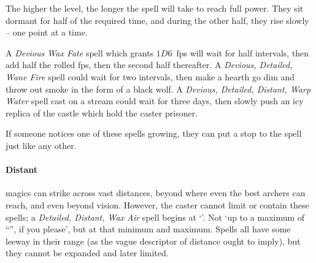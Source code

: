 \begin{multicols}{2}
The higher the level, the longer the spell will take to reach full power.
They sit dormant for half of the required time, and during the other half, they rise slowly -- one point at a time.

A \textit{Devious Wax Fate} spell which grants $1D6$~\glspl{fp} will wait for half \glspl{interval}, then add half the rolled \glspl{fp}, then the second half thereafter.
A \textit{Devious, Detailed, Wane Fire} spell could wait for two \glspl{interval}, then make a hearth go dim and throw out smoke in the form of a black wolf.
A \textit{Devious, Detailed, Distant, Warp Water} spell cast on a stream could wait for three days, then slowly push an icy replica of the castle which hold the caster prisoner.

If someone notices one of these spells growing, they can put a stop to the spell just like any other.

\paragraph{Distant}
magics can strike across vast distances, beyond where even the best archers can reach, and even beyond vision.
\setRange\toggletrue{Distant}%
However, the caster cannot limit or contain these spells; a \textit{Detailed,  Distant, Wax Air} spell begins at `\spellRange'.
Not `up to a maximum of ``\spellRange'', if you please', but at that minimum and maximum.
Spells all have some leeway in their range (as the vague descriptor of distance ought to imply), but they cannot be expanded and later limited.
\togglefalse{Distant}


\end{multicols}
